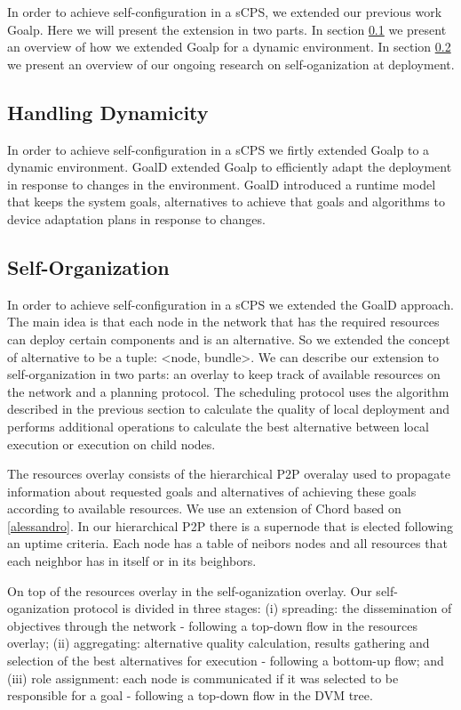 \documentclass[conference]{IEEEtran}
\begin{document}
In order to achieve self-configuration in a sCPS, we extended our previous work Goalp. Here we will present the extension in two parts. In section \ref{handling_dynamicity} we present an overview of how we extended Goalp for a dynamic environment\cite{}. In section \ref{self_organization} we present an overview of our ongoing research on self-oganization at deployment. 

\subsection{Handling Dynamicity}
\label{handling_dynamicity}

In order to achieve self-configuration in a sCPS we firtly extended Goalp to a dynamic environment. GoalD extended Goalp to efficiently adapt the deployment in response to changes in the environment. GoalD introduced a runtime model that keeps the system goals, alternatives to achieve that goals and algorithms to device adaptation plans in response to changes.


\subsection{Self-Organization}
\label{self_organization}

In order to achieve self-configuration in a sCPS we extended the GoalD approach. The main idea is that each node in the network that has the required resources can deploy certain components and is an alternative. So we extended the concept of alternative to be a tuple: <node, bundle>. We can describe our extension to self-organization in two parts: an overlay to keep track of available resources on the network and a planning protocol. The scheduling protocol uses the algorithm described in the previous section to calculate the quality of local deployment and performs additional operations to calculate the best alternative between local execution or execution on child nodes.

The resources overlay consists of the hierarchical P2P overalay used to propagate information about requested goals and alternatives of achieving these goals according to available resources. We use an extension of Chord based on \ref{alessandro}. In our hierarchical P2P there is a supernode that is elected following an uptime criteria. Each node has a table of neibors nodes and all resources that each neighbor has in itself or in its beighbors.


On top of the resources overlay in the self-oganization overlay. Our self-oganization protocol is divided in three stages: (i) spreading: the dissemination of objectives through the network - following a top-down flow in the resources overlay; (ii) aggregating: alternative quality calculation, results gathering and selection of the best alternatives for execution - following a bottom-up flow; and (iii) role assignment: each node is communicated if it was selected to be responsible for a goal - following a top-down flow in the DVM tree. 
\end{document}
